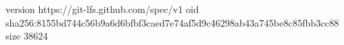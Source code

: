 version https://git-lfs.github.com/spec/v1
oid sha256:8155bd744c56b9a6d6bfbf3caed7e74af5d9c46298ab43a745be8c85fbb3cc88
size 38624
